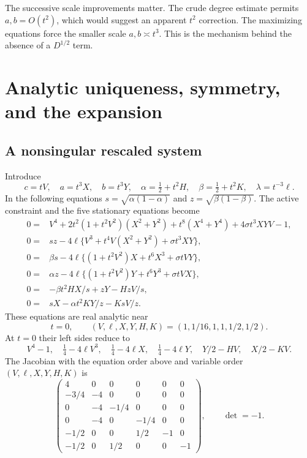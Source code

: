 \documentclass[11pt]{article}
\theoremstyle{definition}
\newcommand{\1}{\mathbf 1}
\begin{document}
The successive scale improvements matter. The crude degree estimate permits $a,b=O(t^2)$, which would suggest an apparent $t^2$ correction. The maximizing equations force the smaller scale $a,b\asymp t^3$. This is the mechanism behind the absence of a $D^{1/2}$ term.

\section{Analytic uniqueness, symmetry, and the expansion}\label{sec:analytic}
\subsection{A nonsingular rescaled system}
Introduce
\[
 c=tV,\quad a=t^3X,\quad b=t^3Y,\quad
 \alpha=\tfrac12+t^2H,\quad\beta=\tfrac12+t^2K,
 \quad\lambda=t^{-3}\ell.
\]
In the following equations $s=\sqrt{\alpha(1-\alpha)}$ and $z=\sqrt{\beta(1-\beta)}$. The active constraint and the five stationary equations become
\begin{align}
0={}&V^4+2t^2(1+t^2V^2)(X^2+Y^2)
       +t^8(X^4+Y^4)+4\sigma t^3XYV-1,\label{eq:ift0}\\
0={}&sz-4\ell\{V^3+t^4V(X^2+Y^2)+\sigma t^3XY\},\label{eq:iftc}\\
0={}&\beta s-4\ell\{(1+t^2V^2)X+t^6X^3+\sigma tVY\},\label{eq:ifta}\\
0={}&\alpha z-4\ell\{(1+t^2V^2)Y+t^6Y^3+\sigma tVX\},\label{eq:iftb}\\
0={}&-\beta t^2HX/s+zY-HzV/s,\label{eq:iftalpha}\\
0={}&sX-\alpha t^2KY/z-KsV/z.\label{eq:iftbeta}
\end{align}
These equations are real analytic near
\begin{equation}\label{eq:basepoint}
 t=0,\qquad (V,\ell,X,Y,H,K)=(1,1/16,1,1,1/2,1/2).
\end{equation}
At $t=0$ their left sides reduce to
\[
 V^4-1,\quad\tfrac14-4\ell V^3,\quad
 \tfrac14-4\ell X,\quad\tfrac14-4\ell Y,\quad
 Y/2-HV,\quad X/2-KV.
\]
The Jacobian with the equation order above and variable order $(V,\ell,X,Y,H,K)$ is
\begin{equation}\label{eq:jacobian}
\begin{pmatrix}
4&0&0&0&0&0\\
-3/4&-4&0&0&0&0\\
0&-4&-1/4&0&0&0\\
0&-4&0&-1/4&0&0\\
-1/2&0&0&1/2&-1&0\\
-1/2&0&1/2&0&0&-1
\end{pmatrix},
\qquad\det=-1.
\end{equation}
\end{document}
